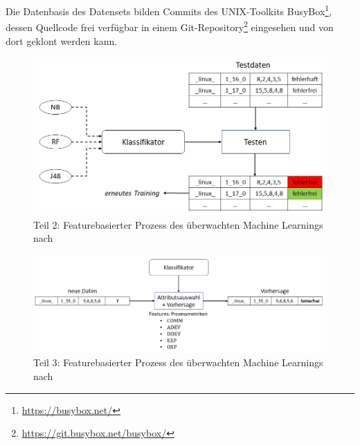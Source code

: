 Die Datenbasis des Datensets bilden Commits des UNIX-Toolkits BusyBox\footnote{\url{https://busybox.net/}}, dessen Quellcode frei verfügbar in einem Git-Repository\footnote{\url{https://git.busybox.net/busybox/}} eingesehen und von dort geklont werden kann.

\begin{figure}[H]
    \centering
    \includegraphics[width=\textwidth]{images/ML2}
    \caption{Teil 2: Featurebasierter Prozess des überwachten Machine Learnings nach \cite{Queiroz2016}}\label{fig:ml2}
\end{figure}

\begin{figure}[H]
    \centering
    \includegraphics[width=\textwidth]{images/ML3}
    \caption{Teil 3: Featurebasierter Prozess des überwachten Machine Learnings nach \cite{Queiroz2016}}\label{fig:ml3}
\end{figure}

\cleardoublepage
